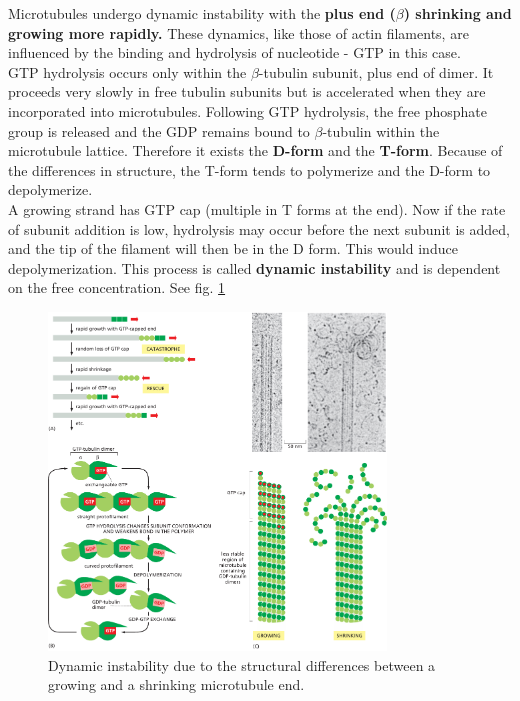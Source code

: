 \documentclass[../main.tex]{subfiles}
\begin{document}
Microtubules undergo dynamic instability with the \textbf{plus end ($\beta$) shrinking and growing more rapidly.} These dynamics, like those of actin filaments, are influenced by the binding and hydrolysis of nucleotide - GTP in this case. \\
\indent GTP hydrolysis occurs only within the $\beta$-tubulin subunit, plus end of dimer. It proceeds very slowly in free tubulin subunits but is accelerated when they are incorporated into microtubules. Following GTP hydrolysis, the free phosphate group is released and 
the GDP remains bound to $\beta$-tubulin within the microtubule lattice. Therefore it exists the \textbf{D-form} and the \textbf{T-form}. Because of the differences in structure, the T-form tends to polymerize and the D-form to depolymerize. \\
\indent A growing strand has GTP cap (multiple in T forms at the end). Now if the rate of subunit addition is low, hydrolysis may occur before the next subunit is added, and the tip of the filament will then be in the D form. This would induce depolymerization. This process is called \textbf{dynamic instability} and is dependent on the free concentration. See fig. \ref{dynamic-instability}

\begin{figure}[H]
	\centering
	\includegraphics[width = 0.8\textwidth]{22}
	\caption{Dynamic instability due to the structural differences between a growing and a shrinking microtubule end.}
	\label{dynamic-instability}
\end{figure}
\end{document}
